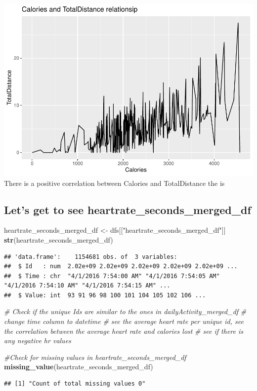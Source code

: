 \documentclass[
]{article}
\newenvironment{Shaded}{\begin{snugshade}}{\end{snugshade}}
\newcommand{\CommentTok}[1]{\textcolor[rgb]{0.56,0.35,0.01}{\textit{#1}}}
\newcommand{\FunctionTok}[1]{\textcolor[rgb]{0.13,0.29,0.53}{\textbf{#1}}}
\newcommand{\NormalTok}[1]{#1}
\newcommand{\OtherTok}[1]{\textcolor[rgb]{0.56,0.35,0.01}{#1}}
\newcommand{\StringTok}[1]{\textcolor[rgb]{0.31,0.60,0.02}{#1}}
\begin{document}
\includegraphics{BellabeatCapstoneProject_files/figure-latex/unnamed-chunk-15-1.pdf}
There is a positive correlation between Calories and TotalDistance the
is

\subsection{Let's get to see
heartrate\_seconds\_merged\_df}\label{lets-get-to-see-heartrate_seconds_merged_df}

\begin{Shaded}
\begin{Highlighting}[]
\NormalTok{heartrate\_seconds\_merged\_df }\OtherTok{\textless{}{-}}\NormalTok{ dfs[[}\StringTok{"heartrate\_seconds\_merged\_df"}\NormalTok{]]}
\FunctionTok{str}\NormalTok{(heartrate\_seconds\_merged\_df)}
\end{Highlighting}
\end{Shaded}

\begin{verbatim}
## 'data.frame':    1154681 obs. of  3 variables:
##  $ Id   : num  2.02e+09 2.02e+09 2.02e+09 2.02e+09 2.02e+09 ...
##  $ Time : chr  "4/1/2016 7:54:00 AM" "4/1/2016 7:54:05 AM" "4/1/2016 7:54:10 AM" "4/1/2016 7:54:15 AM" ...
##  $ Value: int  93 91 96 98 100 101 104 105 102 106 ...
\end{verbatim}

\begin{Shaded}
\begin{Highlighting}[]
\CommentTok{\# Check if the unique Ids are similar to the ones in dailyActivity\_merged\_df}
\CommentTok{\# change time column to datetime}
\CommentTok{\# see the average heart rate per unique id, see the correlation between the average heart rate and calories lost}
\CommentTok{\# see if there is any negative hr values}
\end{Highlighting}
\end{Shaded}

\begin{Shaded}
\begin{Highlighting}[]
\CommentTok{\#Check for missing values in heartrate\_seconds\_merged\_df}
\FunctionTok{missing\_value}\NormalTok{(heartrate\_seconds\_merged\_df)}
\end{Highlighting}
\end{Shaded}

\begin{verbatim}
## [1] "Count of total missing values 0"
\end{verbatim}
\end{document}
